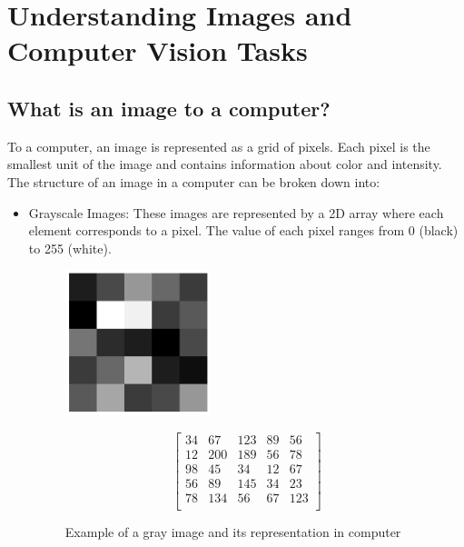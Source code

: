\section{Understanding Images and Computer Vision Tasks}

\subsection{What is an image to a computer?}

To a computer, an image is represented as a grid of pixels. Each pixel is the smallest unit of the image and contains information about color and intensity. The structure of an image in a computer can be broken down into:
\begin{itemize}
  \item Grayscale Images: These images are represented by a 2D array where each element corresponds to a pixel. The value of each pixel ranges from 0 (black) to 255 (white). 
\begin{figure}[H]
    \centering
    \begin{minipage}{0.45\textwidth}
        \centering
        \includegraphics[width=0.4\textwidth]{imgs/grayimg.png}                
    \end{minipage}\hfill
    \begin{minipage}{0.45\textwidth}
        \centering
        \[
        \begin{bmatrix}
            34  &  67  & 123 &  89 &  56 \\
            12  & 200 & 189 &  56 &  78 \\
            98  &  45 &  34 &  12 &  67 \\
            56  &  89 & 145 &  34 &  23 \\
            78  & 134 &  56 &  67 & 123 \\
        \end{bmatrix}
        \]
    \end{minipage}
    \caption{Example of a gray image and its representation in computer}

\end{figure}
\end{itemize}
